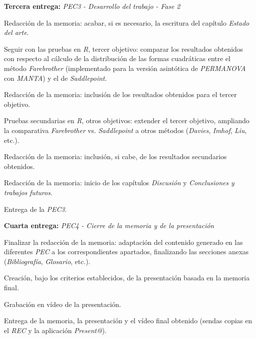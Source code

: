\documentclass[IB,BIB]{TFUOC}%
\newcommand{\checkbox}{\text{\fboxsep=-.15pt\fbox{\rule{0pt}{1.5ex}\rule{1.5ex}{0pt}}}} %
\newcommand{\cmark}{\ding{51}} %
\newcommand{\xmark}{\ding{55}} %
\newcommand{\progress}{\ding{46}} %
\newcommand{\done}{\rlap{\checkbox}{\raisebox{1.2pt}{\large\hspace{1pt}\cmark}}
\hspace{-2.5pt}}
\newcommand{\wontfix}{\rlap{\checkbox}{\raisebox{-1.5pt}{\large\hspace{-.75pt}\xmark}}
\hspace{-2.5pt}}
\begin{document}
\begin{todolist}
  \item \textbf{Tercera entrega:} \textit{PEC3 - Desarrollo del trabajo - Fase 2}
  \begin{todolist}
  \item[\progress] Redacción de la memoria: acabar, si es necesario, la escritura del capítulo \textit{Estado del arte}.
  \item[\wontfix] Seguir con las pruebas en \textit{R}, tercer objetivo: comparar los resultados obtenidos con respecto al cálculo de la distribución de las formas cuadráticas entre el método \textit{Farebrother} (implementado para la versión asintótica de \textit{PERMANOVA} con \textit{MANTA}) y el de \textit{Saddlepoint}.
  \item[\wontfix] Redacción de la memoria: inclusión de los resultados obtenidos para el tercer objetivo.
  \item[\wontfix] Pruebas secundarias en \textit{R}, otros objetivos: extender el tercer objetivo, ampliando la comparativa \textit{Farebrother} vs. \textit{Saddlepoint} a otros métodos (\textit{Davies}, \textit{Imhof}, \textit{Liu}, etc.).
  \item[\wontfix] Redacción de la memoria: inclusión, si cabe, de los resultados secundarios obtenidos.
  \item[\progress] Redacción de la memoria: inicio de los capítulos \textit{Discusión} y \textit{Conclusiones y trabajos futuros}.
  \item[\done] Entrega de la \textit{PEC3}.
  \end{todolist}
\end{todolist}

\newpage

\begin{todolist}
  \item \textbf{Cuarta entrega:} \textit{PEC4 - Cierre de la memoria y de la presentación}
  \begin{todolist}
  \item[\progress] Finalizar la redacción de la memoria: adaptación del contenido generado en las diferentes \textit{PEC} a los correspondientes apartados, finalizando las secciones anexas (\textit{Bibliografía}, \textit{Glosario}, etc.).
  \item[\progress] Creación, bajo los criterios establecidos, de la presentación basada en la memoria final.
  \item[\progress] Grabación en vídeo de la presentación.
  \item Entrega de la memoria, la presentación y el vídeo final obtenido (sendas copias en el \textit{REC} y la aplicación \textit{Present@}).
  \end{todolist}
\end{todolist}
\end{document}
